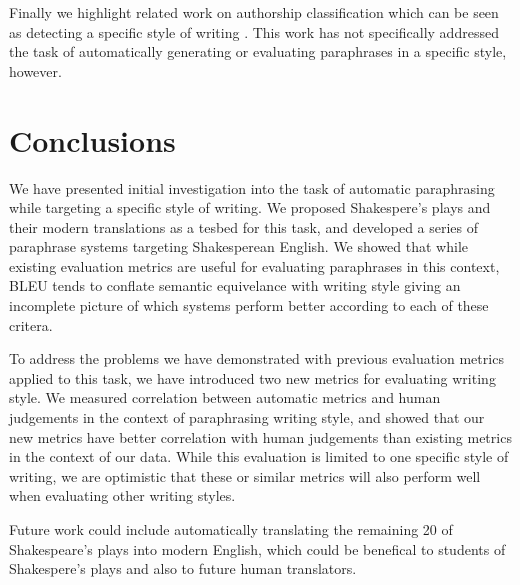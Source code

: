 \documentclass[10pt,a5paper,twoside]{article}
\begin{document}
Finally we highlight related work on authorship classification which can be seen as detecting a specific style of writing \cite{Gamon04,Raghavan10}.
This work has not specifically addressed the task of automatically generating or evaluating paraphrases in a specific style, however.

\section{Conclusions}
We have presented initial investigation into the task of automatic paraphrasing while targeting a specific style of writing.  We proposed Shakespere's plays and their
modern translations as a tesbed for this task, and developed a series of paraphrase systems targeting Shakesperean English.  We showed that while existing evaluation
metrics are useful for evaluating paraphrases in this context, BLEU tends to conflate semantic equivelance with writing style giving an incomplete picture of which systems
perform better according to each of these critera.  

To address the problems we have demonstrated with previous evaluation metrics applied to this task, we have introduced two new metrics for evaluating writing style.
We measured correlation between automatic metrics and human judgements in the context of paraphrasing writing style, and showed
that our new metrics have better correlation with human judgements than existing metrics in the context of our data.
While this evaluation is limited to one specific style of writing, we are optimistic that these or similar metrics will also perform well when
evaluating other writing styles.

Future work could include automatically translating the remaining 20 of Shakespeare's plays into modern English, which could be benefical to students
of Shakespere's plays and also to future human translators.





\end{document}
